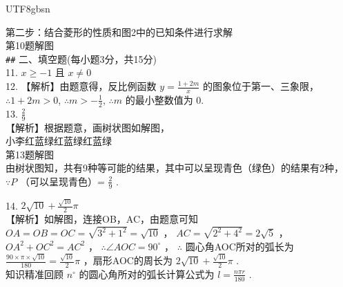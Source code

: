 \begin{minipage}{\textwidth}
\begin{tcolorbox}
\begin{CJK*}{UTF8}{gbsn}
\begin{minipage}[t]{0.48\textwidth}
    第二步：结合菱形的性质和图2中的已知条件进行求解 \\[1ex]
    第10题解图 \\[1ex]
    \verb|##| 二、填空题(每小题3分，共15分) \\[0.5ex]
    11. $ x \ge -1 $ 且 $ x \neq 0 $ \\[0.5ex]
    12. 【解析】由题意得，反比例函数 $ y = \frac{1+2m}{x} $ 的图象位于第一、三象限， $ \therefore 1+2m > 0 $, $ \therefore m > -\frac{1}{2} $, $ \therefore m $ 的最小整数值为 0. \\[0.5ex]
    13. $ \frac{2}{9} $ \\
    【解析】根据题意，画树状图如解图， \\
    小李红蓝绿红蓝绿红蓝绿 \\
    第13题解图 \\
    由树状图知，共有9种等可能的结果，其中可以呈现青色（绿色）的结果有2种， $ \because P $ （可以呈现青色）= $ \frac{2}{9} $ .
    
    \vspace{1em} 
\end{minipage}%
\hfill 
\begin{minipage}[t]{0.48\textwidth}
    \vspace{0pt} 
    \raggedright 
    \setlength{\leftskip}{1.5em} 
    
    14. $ 2\sqrt{10}+\frac{\sqrt{10}}{2}\pi $ \\
    【解析】如解图，连接OB，AC，由题意可知 $ OA=OB=OC=\sqrt{3^{2}+1^{2}}=\sqrt{10} $ ， $ AC=\sqrt{2^{2}+4^{2}}=2\sqrt{5} $ ， $ OA^{2}+OC^{2}=AC^{2} $ ， $ \therefore \angle AOC=90^{\circ} $ ， $ \therefore $ 圆心角AOC所对的弧长为 $ \frac{90\times\pi\times\sqrt{10}}{180}=\frac{\sqrt{10}}{2}\pi $ ，扇形AOC的周长为 $ 2\sqrt{10}+\frac{\sqrt{10}}{2}\pi $ . \\
    知识精准回顾 $ n^{\circ} $ 的圆心角所对的弧长计算公式为 $ l = \frac{n\pi r}{180} $ . \\[1.5ex]
    

\end{minipage}
\end{CJK*}
\end{tcolorbox}
\end{minipage}
